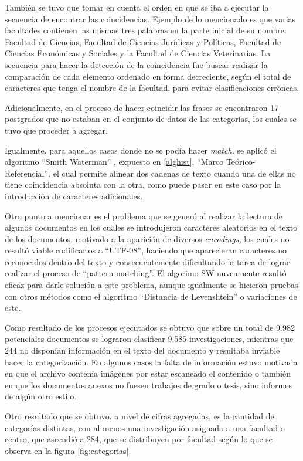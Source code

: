 \documentclass[
  12pt,
  openany]{book}
\begin{document}
También se tuvo que tomar en cuenta el orden en que se iba a ejecutar la secuencia de encontrar las coincidencias. Ejemplo de lo mencionado es que varias facultades contienen las mismas tres palabras en la parte inicial de su nombre: Facultad de Ciencias, Facultad de Ciencias Jurídicas y Políticas, Facultad de Ciencias Económicas y Sociales y la Facultad de Ciencias Veterinarias. La secuencia para hacer la detección de la coincidencia fue buscar realizar la comparación de cada elemento ordenado en forma decreciente, según el total de caracteres que tenga el nombre de la facultad, para evitar clasificaciones erróneas.

Adicionalmente, en el proceso de hacer coincidir las frases se encontraron 17 postgrados que no estaban en el conjunto de datos de las categorías, los cuales se tuvo que proceder a agregar.

Igualmente, para aquellos casos donde no se podía hacer \emph{match,} se aplicó el algoritmo ``Smith Waterman'' \citep{smith1981}, expuesto en \ref{alghist}, ``Marco Teórico-Referencial'', el cual permite alinear dos cadenas de texto cuando una de ellas no tiene coincidencia absoluta con la otra, como puede pasar en este caso por la introducción de caracteres adicionales.

Otro punto a mencionar es el problema que se generó al realizar la lectura de algunos documentos en los cuales se introdujeron caracteres aleatorios en el texto de los documentos, motivado a la aparición de diversos \emph{encodings,} los cuales no resultó viable codificarlos a ``UTF-08'', haciendo que aparecieran caracteres no reconocidos dentro del texto y consecuentemente dificultando la tarea de lograr realizar el proceso de ``pattern matching''. El algorimo SW nuveamente resultó eficaz para darle solución a este problema, aunque igualmente se hicieron pruebas con otros métodos como el algoritmo ``Distancia de Levenshtein'' o variaciones de este.

Como resultado de los procesos ejecutados se obtuvo que sobre un total de 9.982 potenciales documentos se lograron clasificar 9.585 investigaciones, mientras que 244 no disponían información en el texto del documento y resultaba inviable hacer la categorización. En algunos casos la falta de información estuvo motivada en que el archivo contenía imágenes por estar escaneado el contenido o también en que los documentos anexos no fuesen trabajos de grado o tesis, sino informes de algún otro estilo.

Otro resultado que se obtuvo, a nivel de cifras agregadas, es la cantidad de categorías distintas, con al menos una investigación asignada a una facultad o centro, que ascendió a 284, que se distribuyen por facultad según lo que se observa en la figura \ref{fig:categorias}.
\end{document}
